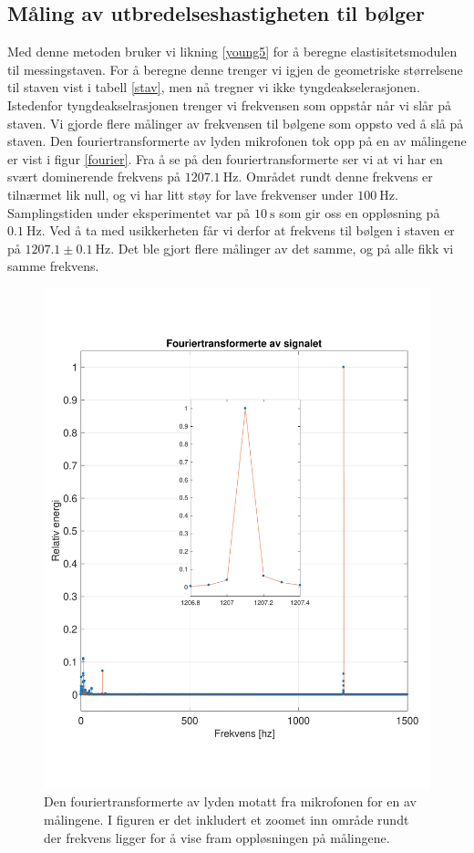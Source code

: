 \documentclass[%
 reprint,
 amsmath,amssymb,
 aps,
 norsk,
 booktabs
]{revtex4-1}
\begin{document}
\subsection{Måling av utbredelseshastigheten til bølger}
Med denne metoden bruker vi likning \eqref{young5} for å beregne elastisitetsmodulen til messingstaven. For å beregne denne trenger vi igjen de geometriske størrelsene til staven vist i tabell \vref{stav}, men nå tregner vi ikke tyngdeakselerasjonen. Istedenfor tyngdeakselrasjonen trenger vi frekvensen som oppstår når vi slår på staven.
Vi gjorde flere målinger av frekvensen til bølgene som oppsto ved å slå på staven. Den fouriertransformerte av lyden mikrofonen tok opp på en av målingene er vist i figur \vref{fourier}. Fra å se på den fouriertransformerte ser vi at vi har en svært dominerende frekvens på $\SI{1207.1}{\hertz}$. Området rundt denne frekvens er tilnærmet lik null, og vi har litt støy for lave frekvenser under $\SI{100}{\hertz}$. Samplingstiden under eksperimentet var på $\SI{10}{\second}$ som gir oss en oppløsning på $\SI{0.1}{\hertz}$. Ved å ta med usikkerheten får vi derfor at frekvens til bølgen i staven er på $1207.1\pm\SI{0.1}{\hertz}$. Det ble gjort flere målinger av det samme, og på alle fikk vi samme frekvens.
\begin{figure}[h!]
  \centering
  \includegraphics[scale=0.4]{fourier.pdf}
  \caption{Den fouriertransformerte av lyden motatt fra mikrofonen for en av målingene. I figuren er det inkludert et zoomet inn område rundt der frekvens ligger for å vise fram oppløsningen på målingene.}
  \label{fourier}
\end{figure}
\end{document}
